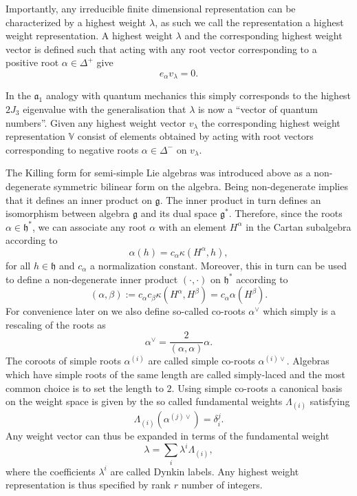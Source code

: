 \documentclass[11pt]{report}
\begin{document}
Importantly, any irreducible finite dimensional representation can be characterized by a highest weight $\lambda$, as such we call the representation a highest weight representation. A highest weight $\lambda$ and the corresponding highest weight vector is defined such that acting with any root vector corresponding to a positive root $\alpha\in\Delta^+$ give
\begin{equation}
    e_\alpha v_\lambda = 0.
\end{equation}

In the $\mathfrak{a}_1$ analogy with quantum mechanics this simply corresponds to the highest $2J_3$ eigenvalue with the generalisation that $\lambda$ is now a ``vector of quantum numbers''. Given any highest weight vector $v_\lambda$ the corresponding highest weight representation $\mathbb{V}$ consist of elements obtained by acting with root vectors corresponding to negative roots $\alpha\in\Delta^-$ on $v_\lambda$.

The Killing form for semi-simple Lie algebras was introduced above as a non-degenerate symmetric bilinear form on the algebra. Being non-degenerate implies that it defines an inner product on $\mathfrak{g}$. The inner product in turn defines an isomorphism between algebra $\mathfrak{g}$ and its dual space $\mathfrak{g}^*$. Therefore, since the roots $\alpha\in\mathfrak{h}^*$, we can associate any root $\alpha$ with an element $H^\alpha$ in the Cartan subalgebra according to 
\begin{equation}
    \alpha(h) = c_\alpha \kappa(H^\alpha,h),
\end{equation}
for all $h\in\mathfrak{h}$ and $c_\alpha$ a normalization constant. Moreover, this in turn can be used to define a non-degenerate inner product $(\cdot,\cdot)$ on $\mathfrak{h}^*$ according to
\begin{equation}
    (\alpha,\beta):= c_\alpha c_\beta \kappa(H^\alpha,H^\beta) = c_\alpha \alpha(H^\beta).
\end{equation}
For convenience later on we also define so-called co-roots $\alpha^\vee$ which simply is a rescaling of the roots as 
\begin{equation}
    \alpha^\vee = \frac{2}{(\alpha,\alpha)}\alpha.
\end{equation}
The coroots of simple roots $\alpha^{(i)}$ are called simple co-roots $\alpha^{(i)\vee}$. Algebras which have simple roots of the same length are called simply-laced and the most common choice is to set the length to $2$. Using simple co-roots a canonical basis on the weight space is given by the so called fundamental weights $\Lambda_{(i)}$ satisfying 
\begin{equation}
    \Lambda_{(i)}(\alpha^{(j)\vee}) = \delta^j_i.
\end{equation}
Any weight vector can thus be expanded in terms of the fundamental weight 
\begin{equation}
    \lambda = \sum_i \lambda^i\Lambda_{(i)},
\end{equation}
where the coefficients $\lambda^i$ are called Dynkin labels. Any highest weight representation is thus specified by rank $r$ number of integers. 
\end{document}
